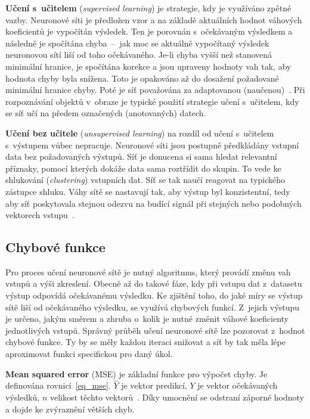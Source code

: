 \textbf{Učení s~učitelem} (\textit{supervised learning}) je strategie, kdy je využíváno zpětné vazby. Neuronové síti je předložen vzor a na základě aktuálních hodnot váhových koeficientů je vypočítán výsledek. Ten je porovnán s~očekávaným výsledkem a následně je spočítána chyba~--~jak moc se aktuálně vypočítaný výsledek neuronovou sítí liší od toho očekávaného. Je-li chyba vyšší než stanovená minimální hranice, je spočítána korekce a jsou upraveny hodnoty vah tak, aby hodnota chyby byla snížena. Toto je opakováno až do dosažení požadované minimální hranice chyby. Poté je síť považována za adaptovanou (naučenou)~\cite{haykinNeuralNetworks}. Při rozpoznávání objektů v~obraze je typické použití strategie učení s~učitelem, kdy se síť učí na předem označených (anotovaných) datech.

\textbf{Učení bez učitele} (\textit{unsupervised learning}) na rozdíl od učení s~učitelem s~výstupem vůbec nepracuje. Neuronové síti jsou postupně předkládány vstupní data bez požadovaných výstupů. Síť je donucena si sama hledat relevantní příznaky, pomocí kterých dokáže data sama roztřídit do skupin. To vede ke shlukování (\textit{clustering}) vstupních dat. Síť se tak naučí reagovat na typického zástupce shluku. Váhy sítě se nastavují tak, aby výstup byl konzistentní, tedy aby síť poskytovala stejnou odezvu na budící signál při stejných nebo podobných vektorech vstupu~\cite{haykinNeuralNetworks}.


\subsection*{Chybové funkce}

Pro proces učení neuronové sítě je nutný algoritmus, který provádí změnu vah vstupů a výši zkreslení. Obecně až do takové fáze, kdy při vstupu dat z~datasetu výstup odpovídá očekávanému výsledku. Ke zjištění toho, do jaké míry se výstup sítě liší od očekávaného výsledku, se využívá chybových funkcí. Z~jejich výstupu je určeno, jakým směrem a zhruba o~kolik je nutné změnit váhové koeficienty jednotlivých vstupů. Správný průběh učení neuronové sítě lze pozorovat z~hodnot chybové funkce. Ty by se měly každou iteraci snižovat a síť by tak měla lépe aproximovat funkci specifickou pro daný úkol.

\textbf{Mean squared error} (MSE) je základní funkce pro výpočet chyby. Je definována rovnicí~\ref{eq_mse}. $\hat{Y}$ je vektor predikcí, $Y$ je vektor očekávaných výsledků, $n$ velikost těchto vektorů~\cite{bookMse}. Díky umocnění se odstraní záporné hodnoty a dojde ke zvýraznění větších chyb.

